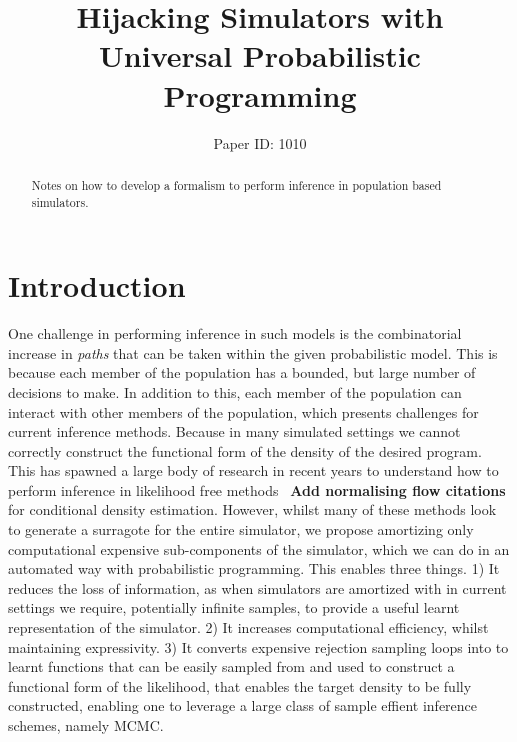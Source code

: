 \documentclass{article}
\title{Hijacking Simulators with Universal Probabilistic Programming}
\author{%
Paper ID: 1010 }
\begin{document}

\maketitle

\begin{abstract}

    Notes on how to develop a formalism to perform inference in population based simulators.
\end{abstract}

\section{Introduction}
\label{sec:intro}

One challenge in performing inference in such models is the combinatorial increase in \emph{paths}
that can be taken within the given probabilistic model.
This is because each member of the population has 
a bounded, but large number of decisions to make. 
In addition to this, each member of the population can interact
with other members of the population, which presents challenges for current inference methods.
Because in many simulated settings we cannot correctly construct the functional form of the density of the 
desired program. 
This has spawned a large body of research in recent years to understand how to perform 
inference in likelihood free methods~\cite{greenberg2019automatic} \textbf{Add normalising flow citations}
for conditional density estimation. However, whilst many of these methods look to generate a surragote 
for the entire simulator, we propose amortizing only computational expensive sub-components 
of the simulator, which we can do in an automated way with probabilistic programming. 
This enables three things. 
1) It reduces the loss of information, as when simulators are amortized with in current
settings we require, potentially infinite samples, to provide a useful learnt representation of the simulator. 
2) It increases computational efficiency, whilst maintaining expressivity. 
3) It converts expensive rejection sampling loops into to learnt functions that can be 
easily sampled from and used to construct a functional form of the likelihood, that enables the 
target density to be fully constructed, enabling one to leverage a large class of sample effient inference schemes, namely MCMC.
\end{document}
